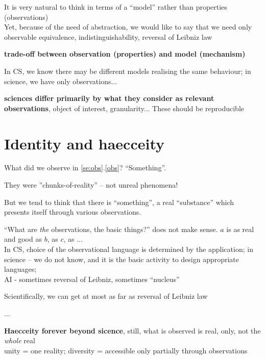 \documentclass[10pt]{article}
\begin{document}
\begin{enu}
\begin{enu}
\item It is very natural to think in terms of a ``model'' rather than
properties (observations)\\
Yet, because of the need of abstraction, we would like to say that we
need only observable equivalence, indistinguishability, reversal of Leibniz
law
\item {\bf trade-off between observation (properties) and model (mechanism)}
\end{enu}
\item In CS, we know there may be different models realising the same
behaviour; in science, we have only observations...
\item {\bf sciences differ primarily by what they consider as relevant
observations}, object of interest, granularity... These should be reproducible
\end{enu}

\section{Identity and haecceity}
\begin{enu}
\item What did we observe in \ref{se:obs}.\ref{obs}? ``Something''.
\item They were ''chunks-of-reality'' -- not unreal phenomena!
\item But we tend to think that there is ``something'', a real ``substance''
which presents itself through various observations.
\item ``What are {\em the} observations, the basic things?'' does not make
sense. $a$ is as real and good as $b$, as $c$, as ... \\
In CS, choice of the observational language is determined by the application;
in science -- we do not know, and it is the basic activity to design
appropriate languages; \\
AI - sometimes reversal of Leibniz, sometimes ``nucleus''
\item Scientifically, we can get at most as far as reversal of Leibniz law
\item ...
\item {\bf Haecceity forever beyond sicence}, still, what is observed is real, only,
not the {\em whole} real\\
unity = one reality; diversity = accessible only partially through observations
\end{enu}
\end{document}
